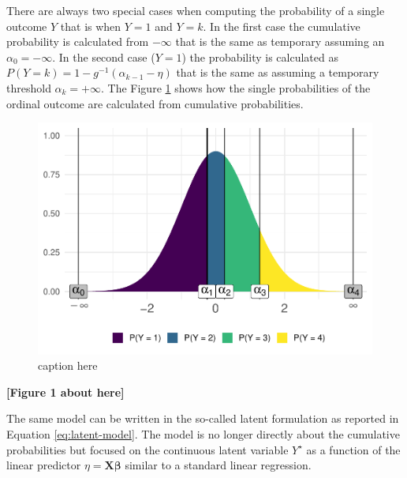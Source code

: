 \documentclass[
  man,floatsintext]{apa6}
\begin{document}
There are always two special cases when computing the probability of a single outcome \(Y\) that is when \(Y = 1\) and \(Y = k\). In the first case the cumulative probability is calculated from \(-\infty\) that is the same as temporary assuming an \(\alpha_0 = -\infty\). In the second case (\(Y = 1\)) the probability is calculated as \(P(Y = k) = 1 - g^{-1}(\alpha_{k - 1} - \eta)\) that is the same as assuming a temporary threshold \(\alpha_k = +\infty\). The Figure \ref{fig:fig-explain-cumulative} shows how the single probabilities of the ordinal outcome are calculated from cumulative probabilities.

\scriptsize

\begin{figure}

{\centering \includegraphics{paper-new_files/figure-latex/fig-explain-cumulative-1} 

}

\caption{caption here}\label{fig:fig-explain-cumulative}
\end{figure}

\begin{center}\textbf{[Figure 1 about here]} \end{center}

\normalsize

The same model can be written in the so-called latent formulation as reported in Equation \eqref{eq:latent-model}. The model is no longer directly about the cumulative probabilities but focused on the continuous latent variable \(Y^\star\) as a function of the linear predictor \(\eta = \mathbf{X} \boldsymbol{\beta}\) similar to a standard linear regression.
\end{document}
